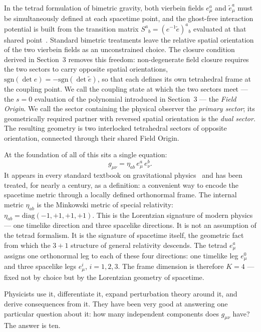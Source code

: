 \documentclass[a4paper,11pt]{article}
\begin{document}
In the tetrad formulation of bimetric gravity, both
vierbein fields $e^a_\mu$ and $\tilde{e}^a_\mu$ must be
simultaneously defined at each spacetime point, and the
ghost-free interaction potential is built from the
transition matrix $S^a{}_b = (e^{-1}\tilde{e})^a{}_b$
evaluated at that shared point~\cite{HR2012a,Alexandrov2013}.
Standard bimetric treatments leave the relative spatial
orientation of the two vierbein fields as an unconstrained
choice. The closure condition derived in Section~3 removes
this freedom: non-degenerate field closure requires the two
sectors to carry opposite spatial orientations,
$\mathrm{sgn}(\det e) = -\mathrm{sgn}(\det \tilde{e})$,
so that each defines its own tetrahedral frame at the
coupling point. We call the coupling state at which
the two sectors meet --- the $s = 0$ evaluation of the
polynomial introduced in Section~3 --- the \emph{Field
Origin}. We call the sector containing the physical
observer the \emph{primary sector}; its geometrically
required partner with reversed spatial orientation is
the \emph{dual sector}. The resulting geometry is two
interlocked tetrahedral sectors of opposite orientation,
connected through their shared Field Origin.

At the foundation of all of this sits a single equation:
\begin{equation}
  g_{\mu\nu} = \eta_{ab}\,e^a_\mu\,e^b_\nu.
  \label{eq:tetrad}
\end{equation}
It appears in every standard textbook on gravitational
physics~\cite{MTW,Carroll,Rovelli} and has been treated,
for nearly a century, as a definition: a convenient way to
encode the spacetime metric through a locally defined
orthonormal frame. The internal metric $\eta_{ab}$ is the
Minkowski metric of special relativity:
$\eta_{ab} = \mathrm{diag}(-1,+1,+1,+1)$. This is the
Lorentzian signature of modern physics --- one timelike
direction and three spacelike directions. It is not an
assumption of the tetrad formalism. It is the signature of
spacetime itself, the geometric fact from which the
$3+1$ structure of general relativity descends. The tetrad
$e^a_\mu$ assigns one orthonormal leg to each of these
four directions: one timelike leg $e^0_\mu$ and three
spacelike legs $e^i_\mu$, $i = 1,2,3$. The frame dimension
is therefore $K = 4$ --- fixed not by choice but by the
Lorentzian geometry of spacetime.

Physicists use it, differentiate it, expand perturbation
theory around it, and derive consequences from it. They have
been very good at answering one particular question about it:
how many independent components does $g_{\mu\nu}$ have?
The answer is ten.
\end{document}
